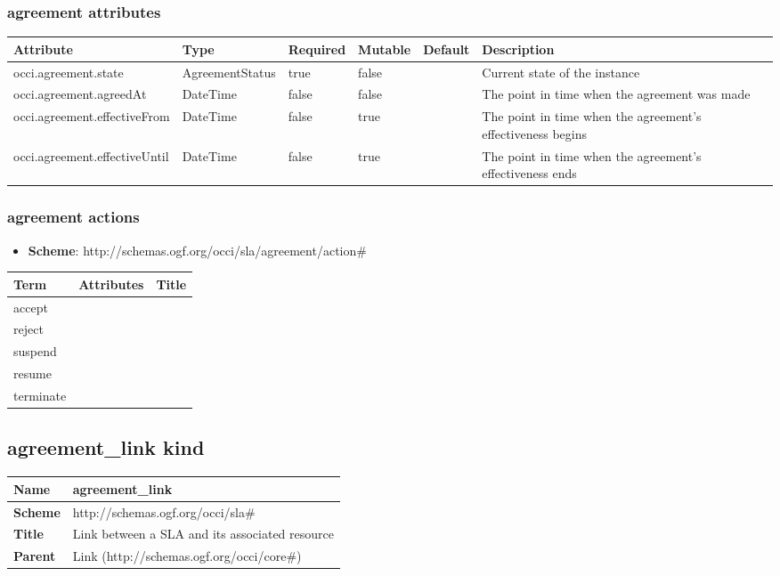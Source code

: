 \documentclass{article}
\begin{document}
\subsubsection{agreement attributes}
\begin{tabularx}{\textwidth}{|l|l|p{1.4cm}|p{1.3cm}|l|X|}
  \hline
  \textbf{Attribute} & \textbf{Type} & \textbf{Required} & \textbf{Mutable} & \textbf{Default} & \textbf{Description} \\
  \hline  
  occi.agreement.state & AgreementStatus & true & false &  & Current state of the instance \\
  \hline
  occi.agreement.agreedAt & DateTime & false & false &  & The point in time when the agreement was made \\
  \hline
  occi.agreement.effectiveFrom & DateTime & false & true &  & The point in time when the agreement’s effectiveness begins \\
  \hline
  occi.agreement.effectiveUntil & DateTime & false & true &  & The point in time when the agreement’s effectiveness ends \\
  \hline
\end{tabularx}

\subsubsection{agreement actions}
\begin{itemize}
	\item \textbf{Scheme}: http://schemas.ogf.org/occi/sla/agreement/action\#
\end{itemize}
\begin{tabularx}{\textwidth}{|l|l|X|}
  \hline
  \textbf{Term}  & \textbf{Attributes} & \textbf{Title} \\
  \hline  
  accept & &  \\
  \hline
  reject & &  \\
  \hline
  suspend & &  \\
  \hline
  resume & &  \\
  \hline
  terminate & &  \\
  \hline
\end{tabularx}

\subsection{agreement\_link kind}
\begin{center}
\begin{tabular}{|l|l|}
  \hline
  \textbf{Name} & agreement\_link \\
  \hline  
  \textbf{Scheme} & http://schemas.ogf.org/occi/sla\# \\
  \hline
  \textbf{Title} & Link between a SLA and its associated resource \\
  \hline
  \textbf{Parent} & Link (http://schemas.ogf.org/occi/core\#) \\
  \hline
\end{tabular}
\end{center}
\end{document}
